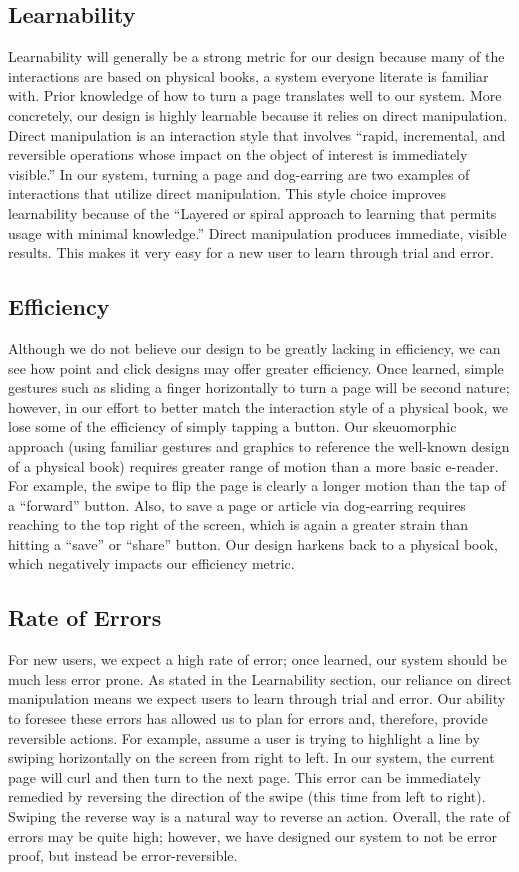 \documentclass[11pt, oneside]{article}   	%
\begin{document}
\subsection {Learnability}
Learnability will generally be a strong metric for our design because many of the interactions are based on physical books, a system everyone literate is familiar with. Prior knowledge of how to turn a page translates well to our system. More concretely, our design is highly learnable because it relies on direct manipulation. Direct manipulation is an interaction style that involves ``rapid, incremental, and reversible operations whose impact on the object of interest is immediately visible.'' \cite{Kwon} In our system, turning a page and dog-earring are two examples of interactions that utilize direct manipulation. This style choice improves learnability because of the ``Layered or spiral approach to learning that permits usage
with minimal knowledge.'' \cite{Kwon} Direct manipulation produces immediate, visible results. This makes it very easy for a new user to learn through trial and error.
\subsection {Efficiency}
Although we do not believe our design to be greatly lacking in efficiency, we can see how point and click designs may offer greater efficiency. Once learned, simple gestures such as sliding a finger horizontally to turn a page will be second nature; however, in our effort to better match the interaction style of a physical book, we lose some of the efficiency of simply tapping a button. Our skeuomorphic approach (using familiar gestures and graphics to reference the well-known design of a physical book) requires greater range of motion than a more basic e-reader. For example, the swipe to flip the page is clearly a longer motion than the tap of a ``forward'' button. Also, to save a page or article via dog-earring requires reaching to the top right of the screen, which is again a greater strain than hitting a  ``save'' or ``share'' button. Our design harkens back to a physical book, which negatively impacts our efficiency metric.
\subsection {Rate of Errors}
For new users, we expect a high rate of error; once learned, our system should be much less error prone. As stated in the Learnability section, our reliance on direct manipulation means we expect users to learn through trial and error. Our ability to foresee these errors has allowed us to plan for errors and, therefore, provide reversible actions. For example, assume a user is trying to highlight a line by swiping horizontally on the screen from right to left. In our system, the current page will curl and then turn to the next page. This error can be immediately remedied by reversing the direction of the swipe (this time from left to right). Swiping the reverse way is a natural way to reverse an action. Overall, the rate of errors may be quite high; however, we have designed our system to not be error proof, but instead be error-reversible.
\end{document}
